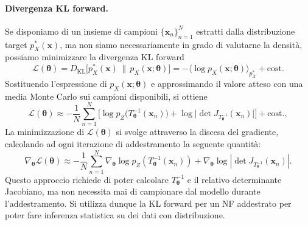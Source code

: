 \paragraph{Divergenza KL forward.} Se disponiamo di un insieme di campioni $\{\mathbf{x}_n\}_{n=1}^N$ estratti dalla distribuzione target $p_X^*(\mathbf{x})$, ma non siamo necessariamente in grado di valutarne la densità, possiamo minimizzare la divergenza KL forward
\begin{equation}
    \mathcal{L}(\boldsymbol{\theta}) = D_{\mathrm{KL}}\big[p_X^*(\mathbf{x}) \,\|\, p_X(\mathbf{x};\boldsymbol{\theta})\big] = -\big\langle \log p_X(\mathbf{x};\boldsymbol{\theta}) \big\rangle_{p_X^*} + \mathrm{cost.}
\end{equation}
Sostituendo l'espressione di $p_X(\mathbf{x};\boldsymbol{\theta})$ e approssimando il valore atteso con una media Monte Carlo sui campioni disponibili, si ottiene
\begin{equation}
    \mathcal{L}(\boldsymbol{\theta}) \approx -\frac{1}{N} \sum_{n=1}^{N} \Big[ \log p_Z\big(T_{\boldsymbol{\theta}}^{-1}(\mathbf{x}_n)\big) + \log \big|\det J_{T_{\boldsymbol{\theta}}^{-1}}(\mathbf{x}_n)\big| \Big] + \mathrm{cost.},
\end{equation}
La minimizzazione di $\mathcal{L}(\boldsymbol{\theta})$ si svolge attraverso la discesa del gradiente, calcolando ad ogni iterazione di addestramento la seguente quantità: 
\begin{equation}
    \nabla_{\boldsymbol{\theta}} \mathcal{L}(\boldsymbol{\theta})\approx - \frac{1}{N} \sum_{n=1}^{N} \nabla_{\boldsymbol{\theta}} \log p_Z(T^{-1}_{\boldsymbol{\theta}}(\mathbf{x}_n)) + \nabla_{\boldsymbol{\theta}} \log |\det J_{T^{-1}_{\boldsymbol{\theta}}}(\mathbf{x}_n)|.
\end{equation}
Questo approccio richiede di poter calcolare $T_{\boldsymbol{\theta}}^{-1}$ e il relativo determinante Jacobiano, ma non necessita mai di campionare dal modello durante l'addestramento. Si utilizza dunque la  KL forward per un NF addestrato per poter fare inferenza statistica su dei dati con distribuzione.

